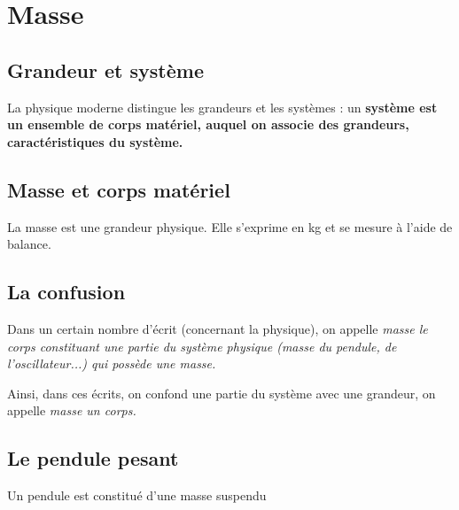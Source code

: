 \section{Masse}

\subsection{Grandeur et système}
La physique moderne distingue les grandeurs et les systèmes : un \bf{système} est un ensemble de corps matériel, auquel on associe des \bf{grandeurs}, caractéristiques du système.

\subsection{Masse et corps matériel}
La masse est une grandeur physique. Elle s'exprime en kg et se mesure à l'aide de balance. 

\subsection{La confusion}
Dans un certain nombre d'écrit (concernant la physique), on appelle \it{masse} le corps constituant une partie du système physique (masse du pendule, de l'oscillateur...) qui possède une masse.

Ainsi, dans ces écrits, on confond une partie du système avec une grandeur, on appelle \it{masse} un corps.

\subsection{Le pendule pesant}
Un pendule est constitué d'une masse suspendu

